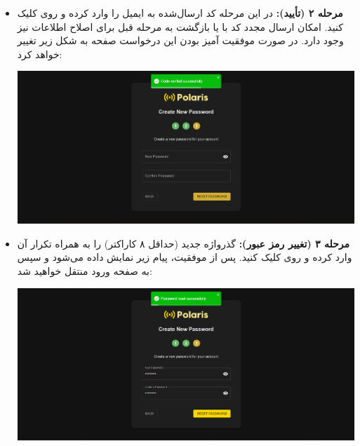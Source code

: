 \begin{itemize}
\begin{itemize}
    		\item \textbf{مرحله ۲ (تأیید):}  
    		در این مرحله کد ارسال‌شده به ایمیل را وارد کرده و روی  کلیک کنید. امکان ارسال مجدد کد با  یا بازگشت به مرحله قبل برای اصلاح اطلاعات  نیز وجود دارد. در صورت موفقیت آمیز بودن این درخواست صفحه به شکل زیر تغییر خواهد کرد:
    			\begin{center}
    				\includegraphics[width=\textwidth]{images/fr-new-pass-empty.png}
    			\end{center}
    		\item \textbf{مرحله ۳ (تغییر رمز عبور):}  
    		گذرواژه جدید (حداقل ۸ کاراکتر) را به همراه تکرار آن وارد کرده و روی  کلیک کنید. پس از موفقیت، پیام زیر نمایش داده می‌شود و سپس به صفحه ورود منتقل خواهید شد:
		    	\begin{center}
		    		\includegraphics[width=\textwidth]{images/fr-new-pass-success.png}
		    	\end{center}
    	\end{itemize}
    \end{itemize}
